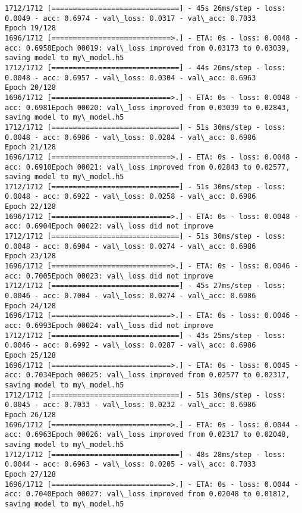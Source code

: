 \documentclass[11pt]{article}
\begin{document}
\begin{Verbatim}[commandchars=\\\{\}]
1712/1712 [==============================] - 45s 26ms/step - loss: 0.0049 - acc: 0.6974 - val\_loss: 0.0317 - val\_acc: 0.7033
Epoch 19/128
1696/1712 [============================>.] - ETA: 0s - loss: 0.0048 - acc: 0.6958Epoch 00019: val\_loss improved from 0.03173 to 0.03039, saving model to my\_model.h5
1712/1712 [==============================] - 44s 26ms/step - loss: 0.0048 - acc: 0.6957 - val\_loss: 0.0304 - val\_acc: 0.6963
Epoch 20/128
1696/1712 [============================>.] - ETA: 0s - loss: 0.0048 - acc: 0.6981Epoch 00020: val\_loss improved from 0.03039 to 0.02843, saving model to my\_model.h5
1712/1712 [==============================] - 51s 30ms/step - loss: 0.0048 - acc: 0.6986 - val\_loss: 0.0284 - val\_acc: 0.6986
Epoch 21/128
1696/1712 [============================>.] - ETA: 0s - loss: 0.0048 - acc: 0.6910Epoch 00021: val\_loss improved from 0.02843 to 0.02577, saving model to my\_model.h5
1712/1712 [==============================] - 51s 30ms/step - loss: 0.0048 - acc: 0.6922 - val\_loss: 0.0258 - val\_acc: 0.6986
Epoch 22/128
1696/1712 [============================>.] - ETA: 0s - loss: 0.0048 - acc: 0.6904Epoch 00022: val\_loss did not improve
1712/1712 [==============================] - 51s 30ms/step - loss: 0.0048 - acc: 0.6904 - val\_loss: 0.0274 - val\_acc: 0.6986
Epoch 23/128
1696/1712 [============================>.] - ETA: 0s - loss: 0.0046 - acc: 0.7005Epoch 00023: val\_loss did not improve
1712/1712 [==============================] - 45s 27ms/step - loss: 0.0046 - acc: 0.7004 - val\_loss: 0.0274 - val\_acc: 0.6986
Epoch 24/128
1696/1712 [============================>.] - ETA: 0s - loss: 0.0046 - acc: 0.6993Epoch 00024: val\_loss did not improve
1712/1712 [==============================] - 43s 25ms/step - loss: 0.0046 - acc: 0.6992 - val\_loss: 0.0287 - val\_acc: 0.6986
Epoch 25/128
1696/1712 [============================>.] - ETA: 0s - loss: 0.0045 - acc: 0.7034Epoch 00025: val\_loss improved from 0.02577 to 0.02317, saving model to my\_model.h5
1712/1712 [==============================] - 51s 30ms/step - loss: 0.0045 - acc: 0.7033 - val\_loss: 0.0232 - val\_acc: 0.6986
Epoch 26/128
1696/1712 [============================>.] - ETA: 0s - loss: 0.0044 - acc: 0.6963Epoch 00026: val\_loss improved from 0.02317 to 0.02048, saving model to my\_model.h5
1712/1712 [==============================] - 48s 28ms/step - loss: 0.0044 - acc: 0.6963 - val\_loss: 0.0205 - val\_acc: 0.7033
Epoch 27/128
1696/1712 [============================>.] - ETA: 0s - loss: 0.0044 - acc: 0.7040Epoch 00027: val\_loss improved from 0.02048 to 0.01812, saving model to my\_model.h5

\end{Verbatim}
\end{document}

